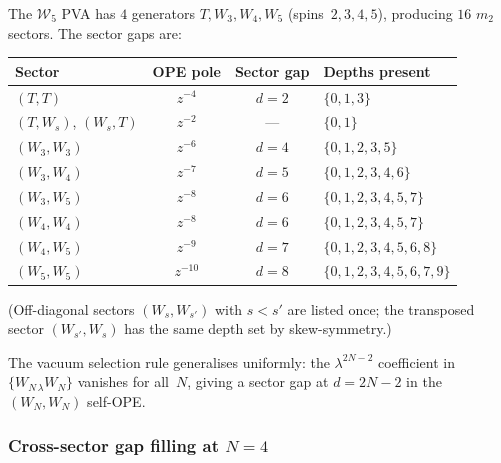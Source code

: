 \begin{computation}
\label{comp:w5-depth-degree-2}
%
The $\mathcal{W}_5$ PVA has $4$ generators
$T, W_3, W_4, W_5$ (spins~$2,3,4,5$), producing $16$
$m_2$ sectors. The sector gaps are:
\begin{center}
\small
\renewcommand{\arraystretch}{1.3}
\begin{tabular}{lccl}
\toprule
\textbf{Sector} & \textbf{OPE pole}
 & \textbf{Sector gap} & \textbf{Depths present} \\
\midrule
$(T,T)$ & $z^{-4}$ & $d = 2$ & $\{0, 1, 3\}$ \\
$(T,W_s)$, $(W_s,T)$ & $z^{-2}$ & --- & $\{0, 1\}$ \\
$(W_3,W_3)$ & $z^{-6}$ & $d = 4$ & $\{0, 1, 2, 3, 5\}$ \\
$(W_3,W_4)$ & $z^{-7}$ & $d = 5$ & $\{0, 1, 2, 3, 4, 6\}$ \\
$(W_3,W_5)$ & $z^{-8}$ & $d = 6$ & $\{0, 1, 2, 3, 4, 5, 7\}$ \\
$(W_4,W_4)$ & $z^{-8}$ & $d = 6$ & $\{0, 1, 2, 3, 4, 5, 7\}$ \\
$(W_4,W_5)$ & $z^{-9}$ & $d = 7$ & $\{0, 1, 2, 3, 4, 5, 6, 8\}$ \\
$(W_5,W_5)$ & $z^{-10}$ & $d = 8$ & $\{0, 1, 2, 3, 4, 5, 6, 7, 9\}$ \\
\bottomrule
\end{tabular}
\end{center}
\textup{(}Off-diagonal sectors $(W_s, W_{s'})$ with
$s < s'$ are listed once; the transposed sector
$(W_{s'}, W_s)$ has the same depth set by
skew-symmetry.\textup{)}

The vacuum selection rule generalises uniformly:
the $\lambda^{2N-2}$ coefficient in
$\{W_{N\,\lambda} W_N\}$ vanishes for all~$N$,
giving a sector gap at $d = 2N - 2$ in the
$(W_N, W_N)$ self-OPE.
\end{computation}

\subsubsection{Cross-sector gap filling at $N = 4$}
\label{subsubsec:cross-sector-filling}

